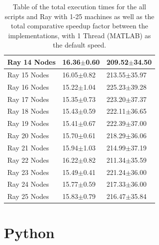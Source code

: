 \documentclass[12pt, a4paper]{article}
\begin{document}
\begin{appendices}
\begin{table}[H]
\begin{tabular}{|l|l|l|}
    Ray 14 Nodes       & 16.36$\pm$0.60     & 209.52$\pm$34.50 \\ \hline
    Ray 15 Nodes       & 16.05$\pm$0.82     & 213.55$\pm$35.97 \\ \hline
    Ray 16 Nodes       & 15.22$\pm$1.04     & 225.23$\pm$39.28 \\ \hline
    Ray 17 Nodes       & 15.35$\pm$0.73     & 223.20$\pm$37.37 \\ \hline
    Ray 18 Nodes       & 15.43$\pm$0.59     & 222.11$\pm$36.65 \\ \hline
    Ray 19 Nodes       & 15.41$\pm$0.67     & 222.39$\pm$37.00 \\ \hline
    Ray 20 Nodes       & 15.70$\pm$0.61     & 218.29$\pm$36.06 \\ \hline
    Ray 21 Nodes       & 15.94$\pm$1.03     & 214.99$\pm$37.19 \\ \hline
    Ray 22 Nodes       & 16.22$\pm$0.82     & 211.34$\pm$35.59 \\ \hline
    Ray 23 Nodes       & 15.49$\pm$0.41     & 221.24$\pm$36.00 \\ \hline
    Ray 24 Nodes       & 15.77$\pm$0.59     & 217.33$\pm$36.00 \\ \hline
    Ray 25 Nodes       & 15.83$\pm$0.79     & 216.47$\pm$35.84 \\ \hline
    \end{tabular}

    \caption{Table of the total execution times for the all scripts and Ray with 1-25 machines as well as the total comparative speedup factor between the implementations, with 1 Thread (MATLAB) as the default speed.}
    \label{AppendixFullTimeExecSpeedup}
\end{table}


\section{Python}



\end{appendices}
\end{document}
